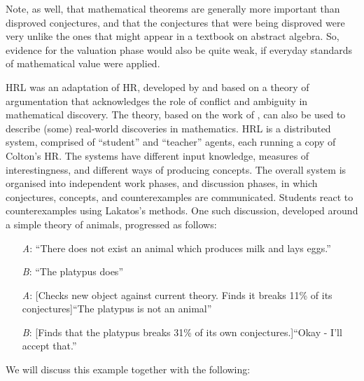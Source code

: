 Note, as well, that mathematical theorems are generally more important
than disproved conjectures, and that the conjectures that were being
disproved were very unlike the ones that might appear in a textbook on
abstract algebra.  So, evidence for the valuation phase would also be
quite weak, if everyday standards of mathematical value were applied.

\begin{ep}\label{ex:platypus}
{\sf HRL} was an adaptation of {\sf HR}, developed by \citet{pease07} and 
based on a theory of argumentation that acknowledges the role of conflict and ambiguity in mathematical discovery.  The theory, based on the work of
\citet{lakatos}, can also be used to describe (some) real-world
discoveries in mathematics.  {\sf HRL} is a distributed system,
comprised of ``student'' and ``teacher'' agents, each running a copy
of Colton's {\sf HR}.  The systems have different input knowledge,
measures of interestingness, and different ways of producing concepts.
The overall system is organised into independent work phases, and
discussion phases, in which conjectures, concepts, and counterexamples
are communicated.  Students react to counterexamples using Lakatos's
methods.  One such discussion, developed around a simple theory of
animals, progressed as follows:
\begin{itemize}
\item[\emph{A}:] ``There does not exist an animal which produces milk and lays eggs.''
\item[\emph{B}:] ``The platypus does''
\item[\emph{A}:] {[}Checks new object against current theory. Finds it breaks 11\% of its conjectures{]}\newline ``The platypus is not an animal''
\item[\emph{B}:] {[}Finds that the platypus breaks 31\% of its own conjectures.{]}\newline ``Okay - I'll accept that.''
\end{itemize}
\end{ep}

We will discuss this example together with the following:

